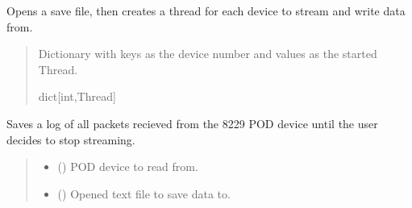 \documentclass[letterpaper,10pt,english]{sphinxmanual}
\begin{document}
\begin{fulllineitems}
\begin{fulllineitems}
\label{\detokenize{Setup.SetupOneDevice:Setup.SetupOneDevice.Setup_8229.Setup8229._StreamThreading}}
\pysigstartsignatures
{}
\pysigstopsignatures
\sphinxAtStartPar
Opens a save file, then creates a thread for each device to stream and write         data from.
\begin{quote}\begin{description}
\sphinxAtStartPar
Dictionary with keys as the device number and values as the                 started Thread.

\sphinxAtStartPar
dict{[}int,Thread{]}

\end{description}\end{quote}

\end{fulllineitems}


\begin{fulllineitems}
\label{\detokenize{Setup.SetupOneDevice:Setup.SetupOneDevice.Setup_8229.Setup8229._StreamUntilStop}}
\pysigstartsignatures
{}
\pysigstopsignatures
\sphinxAtStartPar
Saves a log of all packets recieved from the 8229 POD device until the user decides         to stop streaming.
\begin{quote}\begin{description}
\begin{itemize}
\item {} 
\sphinxAtStartPar
{} () \textendash{} POD device to read from.

\item {} 
\sphinxAtStartPar
{} () \textendash{} Opened text file to save data to.

\end{itemize}

\end{description}\end{quote}

\end{fulllineitems}


\end{fulllineitems}
\end{document}
